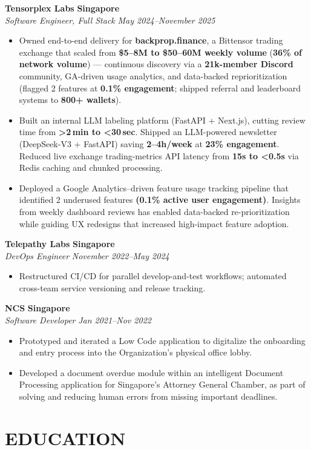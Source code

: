 \documentclass[11pt,letterpaper]{article}
\newcommand{\role}[4]{
  \vspace{0.15em}
  \begin{center}
  \textbf{#1} \hfill \textbf{#2} \\
  \textit{#3} \hfill \textit{#4}
  \end{center}
  \vspace{-1em}
}
\begin{document}
\role{Tensorplex Labs}{Singapore}{Software Engineer, Full Stack}{May 2024--November 2025}
\begin{itemize}
  \item Owned end-to-end delivery for \textbf{backprop.finance}, a Bittensor trading exchange that scaled from \textbf{\$5--8M to \$50--60M weekly volume} (\textbf{36\% of network volume}) — continuous discovery via a \textbf{21k-member Discord} community, GA-driven usage analytics, and data-backed reprioritization (flagged 2 features at \textbf{0.1\% engagement}; shipped referral and leaderboard systems to \textbf{800+ wallets}).
  \item Built an internal LLM labeling platform (FastAPI + Next.js), cutting review time from \textbf{>2\,min to <30\,sec}. Shipped an LLM-powered newsletter (DeepSeek-V3 + FastAPI) saving \textbf{2--4h/week} at \textbf{23\% engagement}. Reduced live exchange trading-metrics API latency from \textbf{15s to <0.5s} via Redis caching and chunked processing.
  \item Deployed a Google Analytics–driven feature usage tracking pipeline that identified 2 underused features \textbf{(0.1\% active user engagement)}. Insights from weekly dashboard reviews has enabled data-backed re-prioritization while guiding UX redesigns that increased high-impact feature adoption.
\end{itemize}

\role{Telepathy Labs}{Singapore}{DevOps Engineer}{November 2022--May 2024}
\begin{itemize}
  \item Restructured CI/CD for parallel develop-and-test workflows; automated cross-team service versioning and release tracking.
\end{itemize}

\role{NCS}{Singapore}{Software Developer}{Jan 2021--Nov 2022}
\begin{itemize}
  \item Prototyped and iterated a Low Code application to digitalize the onboarding and entry process into the Organization's physical office lobby.
  \item Developed a document overdue module within an intelligent Document Processing application for Singapore's Attorney General Chamber, as part of solving and reducing human errors from missing important deadlines.
\end{itemize}

\section{EDUCATION}
\end{document}
